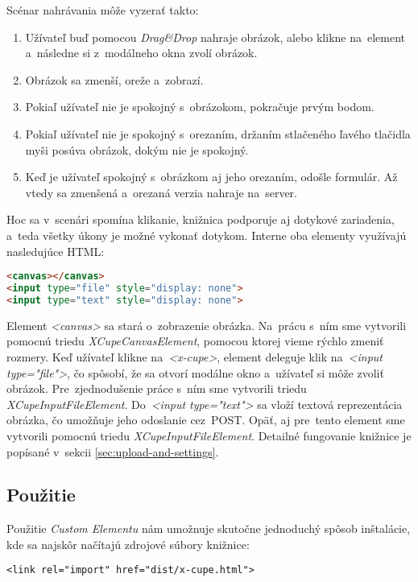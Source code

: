 Scénar nahrávania môže vyzerať takto:
\begin{enumerate}
	\item Užívateľ buď pomocou \emph{Drag\&Drop} nahraje obrázok, alebo klikne na~element a~následne si z~modálneho okna zvolí obrázok.
	\item Obrázok sa zmenší, oreže a~zobrazí.
	\item Pokiaľ užívateľ nie je spokojný s~obrázokom, pokračuje prvým bodom.
	\item Pokiaľ užívateľ nie je spokojný s~orezaním, držaním stlačeného ľavého tlačidla myši posúva obrázok, dokým nie je spokojný.
	\item Keď je užívateľ spokojný s~obrázkom aj jeho orezaním, odošle formulár. Až vtedy sa zmenšená a~orezaná verzia nahraje na~server.
\end{enumerate}

Hoc sa v~scenári spomína klikanie, knižnica podporuje aj dotykové zariadenia, a~teda všetky úkony je možné vykonať dotykom. Interne oba elementy využívajú nasledujúce HTML:

\begin{lstlisting}[language=HTML,caption=Interná štruktúra elementov \emph{<x-cupe>} a~\emph{<x-cupe-gallery>}.]
<canvas></canvas>
<input type="file" style="display: none">
<input type="text" style="display: none">
\end{lstlisting}


Element \emph{<canvas>} sa stará o~zobrazenie obrázka. Na~prácu s~ním sme vytvorili pomocnú triedu \emph{XCupeCanvasElement}, pomocou ktorej vieme rýchlo zmeniť rozmery. Keď užívateľ klikne na~\emph{<x-cupe>}, element deleguje klik na~\emph{<input type="file"\textgreater}, čo spôsobí, že sa otvorí modálne okno a~užívateľ si môže zvoliť obrázok. Pre~zjednodušenie práce s~ním sme vytvorili triedu \emph{XCupeInputFileElement}. Do~\emph{<input type="text"\textgreater} sa vloží textová reprezentácia obrázka, čo umožňuje jeho odoslanie cez~POST. Opäť, aj pre~tento element sme vytvorili pomocnú triedu \emph{XCupeInputFileElement}. Detailné fungovanie knižnice je popísané v~sekcii \ref{sec:upload-and-settings}.

\subsection{Použitie}

Použitie \emph{Custom Elementu} nám umožnuje skutočne jednoduchý spôsob inštalácie, kde sa najskôr načítajú zdrojové súbory knižnice:
\begin{lstlisting}
<link rel="import" href="dist/x-cupe.html">
\end{lstlisting}

